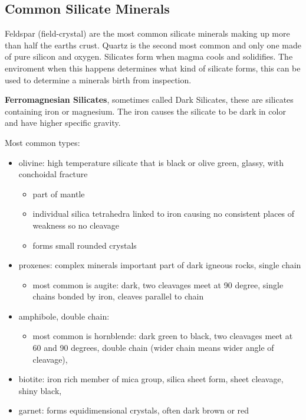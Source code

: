 \documentclass{article}
\begin{document}
\subsection{Common Silicate Minerals} %
\label{sub:common_silicate_minerals}
Feldspar (field-crystal) are the most common silicate minerals making up more than half the earths crust. Quartz is the second most common and only one made of pure silicon and oxygen. Silicates form when magma cools and solidifies. The enviroment when this happens determines what kind of silicate forms, this can be used to determine a minerals birth from inspection.

\textbf{Ferromagnesian Silicates}, sometimes called Dark Silicates, these are silicates containing iron or magnesium. The iron causes the silicate to be dark in color and have higher specific gravity.

Most common types:
\begin{itemize}
    \item olivine: high temperature silicate that is black or olive green, glassy, with conchoidal fracture
    \begin{itemize}
        \item part of mantle
        \item individual silica tetrahedra linked to iron causing no consistent places of weakness so no cleavage
        \item forms small rounded crystals
    \end{itemize}
    \item proxenes: complex minerals important part of dark igneous rocks, single chain
    \begin{itemize}
        \item most common is augite: dark, two cleavages meet at 90 degree, single chains bonded by iron, cleaves parallel to chain
    \end{itemize}
    \item amphibole, double chain:
    \begin{itemize}
        \item most common is hornblende: dark green to black, two cleavages meet at 60 and 90 degrees, double chain (wider chain means wider angle of cleavage),
    \end{itemize}
    \item biotite: iron rich member of mica group, silica sheet form, sheet cleavage, shiny black,
    \item garnet: forms equidimensional crystals, often dark brown or red
\end{itemize}
\end{document}
